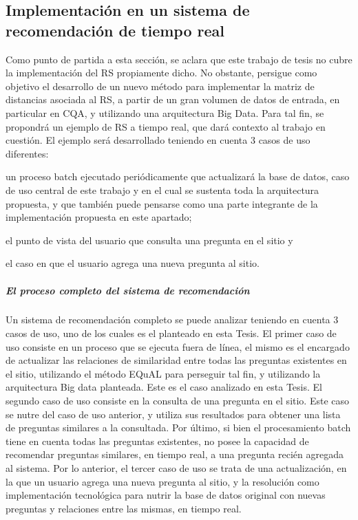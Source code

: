 \subsection{Implementación en un sistema de recomendación de tiempo real}

Como punto de partida a esta sección, se aclara que este trabajo de tesis no cubre la implementación del RS propiamente dicho. No obstante, persigue como objetivo el desarrollo de un nuevo método para implementar la matriz de distancias asociada al RS, a partir de un gran volumen de datos de entrada, en particular en CQA, y utilizando una arquitectura Big Data. Para tal fin, se propondrá un ejemplo de RS a tiempo real, que dará contexto al trabajo en cuestión. El ejemplo será desarrollado teniendo en cuenta 3 casos de uso diferentes: \begin{enumerate*} [label=(\roman*)] \item un proceso batch ejecutado periódicamente que actualizará la base de datos, caso de uso central de este trabajo y en el cual se sustenta toda la arquitectura propuesta, y que también puede pensarse como una parte integrante de la implementación propuesta en este apartado; \item el punto de vista del usuario que consulta una pregunta en el sitio y \item el caso en que el usuario agrega una nueva pregunta al sitio.\end{enumerate*}

\subparagraph{El proceso completo del sistema de recomendación}
Un sistema de recomendación completo se puede analizar teniendo en cuenta 3 casos de uso, uno de los cuales es el planteado en esta Tesis.
\bigskip El primer caso de uso consiste en un proceso que se ejecuta fuera de línea, el mismo es el encargado de actualizar las relaciones de similaridad entre todas las preguntas existentes en el sitio, utilizando el método EQuAL para perseguir tal fin, y utilizando la arquitectura Big data planteada. Este es el caso analizado en esta Tesis. El segundo caso de uso consiste en la consulta de una pregunta en el sitio. Este caso se nutre del caso de uso anterior, y utiliza sus resultados para obtener una lista de preguntas similares a la consultada. Por último, si bien el procesamiento batch tiene en cuenta todas las preguntas existentes, no posee la capacidad de recomendar preguntas similares, en tiempo real, a una pregunta recién agregada al sistema. Por lo anterior, el tercer caso de uso se trata de una actualización, en la que un usuario agrega una nueva pregunta al sitio, y la resolución como implementación tecnológica para nutrir la base de datos original con nuevas preguntas y relaciones entre las mismas, en tiempo real.

